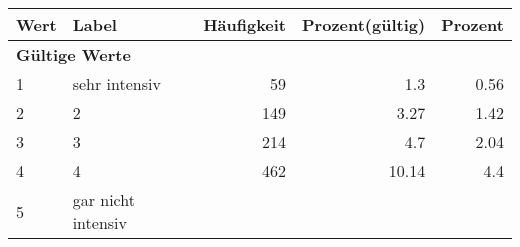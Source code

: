     \begin{longtable}{lXrrr}
     \toprule
     \textbf{Wert} & \textbf{Label} & \textbf{Häufigkeit} & \textbf{Prozent(gültig)} & \textbf{Prozent} \\
     \endhead
     \midrule
     \multicolumn{5}{l}{\textbf{Gültige Werte}}\\

     1 &
     \multicolumn{1}{X}{ sehr intensiv   } &


       \num{59} &
       \num[round-mode=places,round-precision=2]{1.3} &
         \num[round-mode=places,round-precision=2]{0.56} \\

     2 &
     \multicolumn{1}{X}{ 2   } &


       \num{149} &
       \num[round-mode=places,round-precision=2]{3.27} &
         \num[round-mode=places,round-precision=2]{1.42} \\

     3 &
     \multicolumn{1}{X}{ 3   } &


       \num{214} &
       \num[round-mode=places,round-precision=2]{4.7} &
         \num[round-mode=places,round-precision=2]{2.04} \\

     4 &
     \multicolumn{1}{X}{ 4   } &


       \num{462} &
       \num[round-mode=places,round-precision=2]{10.14} &
         \num[round-mode=places,round-precision=2]{4.4} \\

     5 &
     \multicolumn{1}{X}{ gar nicht intensiv   } &



\end{longtable}
